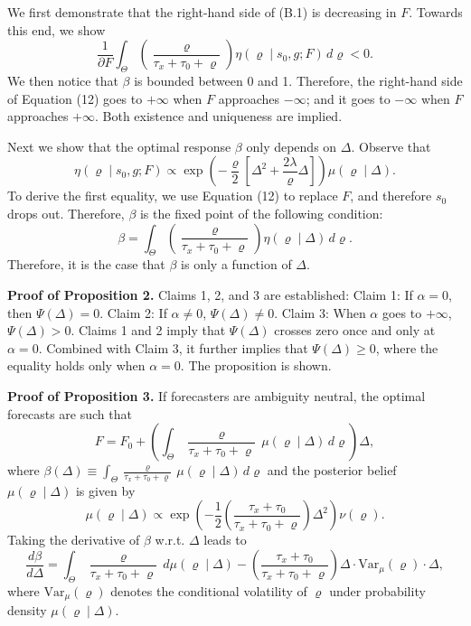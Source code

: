 \documentclass[12pt,a4paper]{article}
\newenvironment{original}
  {\par\medskip\noindent\ignorespaces}
  {\par\medskip}
\begin{document}
\begin{original}
We first demonstrate that the right-hand side of (B.1) is decreasing in $F$. Towards this end, we show
\[
\frac{1}{\partial F} \int_{\Theta} \left( \frac{\varrho}{\tau_x + \tau_0 + \varrho} \right) \eta(\varrho \mid s_0, g; F) \, d\varrho < 0.
\]
We then notice that $\beta$ is bounded between 0 and 1. Therefore, the right-hand side of Equation (12) goes to $+\infty$ when $F$ approaches $-\infty$; and it goes to $-\infty$ when $F$ approaches $+\infty$. Both existence and uniqueness are implied.

Next we show that the optimal response $\beta$ only depends on $\Delta$. Observe that
\[
\eta(\varrho \mid s_0, g; F) \propto \exp\!\left( -\frac{\varrho}{2}\left[ \Delta^2 + \frac{2\lambda}{\varrho} \Delta \right] \right) \mu(\varrho \mid \Delta).
\]
To derive the first equality, we use Equation (12) to replace $F$, and therefore $s_0$ drops out. Therefore, $\beta$ is the fixed point of the following condition:
\[
\beta = \int_{\Theta} \left( \frac{\varrho}{\tau_x + \tau_0 + \varrho} \right) \eta(\varrho \mid \Delta) \, d\varrho.
\]
Therefore, it is the case that $\beta$ is only a function of $\Delta$.

\textbf{Proof of Proposition 2.} Claims 1, 2, and 3 are established: Claim 1: If $\alpha = 0$, then $\Psi(\Delta) = 0$. Claim 2: If $\alpha \neq 0$, $\Psi(\Delta) \neq 0$. Claim 3: When $\alpha$ goes to $+\infty$, $\Psi(\Delta) > 0$. Claims 1 and 2 imply that $\Psi(\Delta)$ crosses zero once and only at $\alpha = 0$. Combined with Claim 3, it further implies that $\Psi(\Delta) \geq 0$, where the equality holds only when $\alpha = 0$. The proposition is shown.

\textbf{Proof of Proposition 3.} If forecasters are ambiguity neutral, the optimal forecasts are such that
\[
F = F_0 + \left( \int_{\Theta} \frac{\varrho}{\tau_x + \tau_0 + \varrho} \, \mu(\varrho \mid \Delta) \, d\varrho \right) \Delta,
\]
where $\beta(\Delta) \equiv \int_{\Theta} \frac{\varrho}{\tau_x + \tau_0 + \varrho} \, \mu(\varrho \mid \Delta) \, d\varrho$ and the posterior belief $\mu(\varrho \mid \Delta)$ is given by
\[
\mu(\varrho \mid \Delta) \propto \exp\!\left( -\frac{1}{2} \left( \frac{\tau_x + \tau_0}{\tau_x + \tau_0 + \varrho} \right) \Delta^2 \right) \nu(\varrho).
\]
Taking the derivative of $\beta$ w.r.t. $\Delta$ leads to
\[
\frac{d\beta}{d\Delta} = \int_{\Theta} \frac{\varrho}{\tau_x + \tau_0 + \varrho} \, d\mu(\varrho \mid \Delta) - \left( \frac{\tau_x + \tau_0}{\tau_x + \tau_0 + \varrho} \right) \Delta \cdot \text{Var}_{\mu}(\varrho) \cdot \Delta,
\]
where $\text{Var}_{\mu}(\varrho)$ denotes the conditional volatility of $\varrho$ under probability density $\mu(\varrho \mid \Delta)$.


\end{original}
\end{document}
